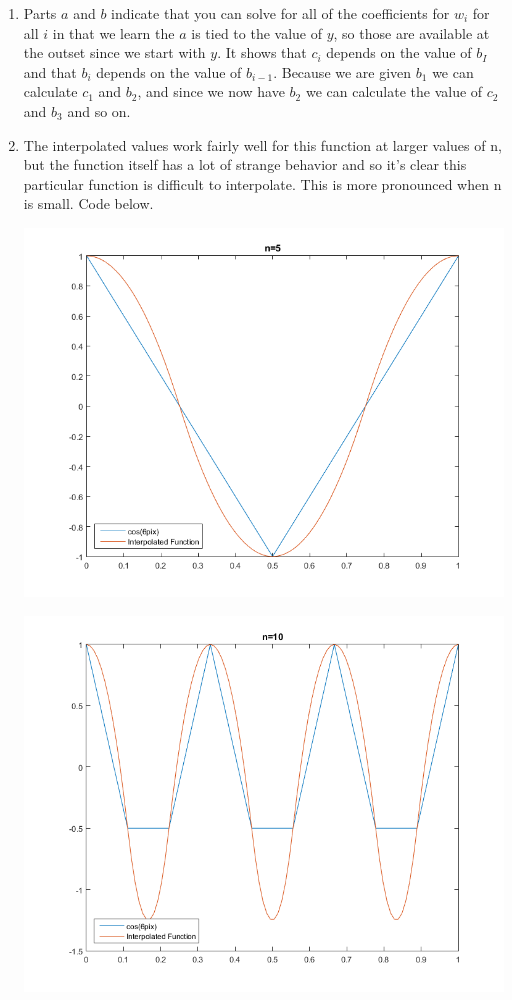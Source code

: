 \documentclass[11pt,a4paper]{article}
\begin{document}
\begin{itemize}
\begin{enumerate} [label={\alph*)}]
					\item Parts $a$ and $b$ indicate that you can solve for all of the coefficients for $w_i$ for all $i$ in that we learn the $a$ is tied to the value of $y$, so those are available at the outset since we start with $y$. It shows that $c_i$ depends on the value of $b_I$ and that $b_i$ depends on the value of $b_{i-1}$. Because we are given $b_1$ we can calculate $c_1$ and $b_2$, and since we now have $b_2$ we can calculate the value of $c_2$ and $b_3$ and so on.
					\item The interpolated values work fairly well for this function at larger values of n, but the function itself has a lot of strange behavior and so it's clear this particular function is difficult to interpolate. This is more pronounced when n is small. Code below.
					\begin{center}
						\includegraphics[width=1\linewidth]{ch5q33_5}
					\end{center}
					\begin{center}
						\includegraphics[width=1\linewidth]{ch5q33_10}

\end{center}
\end{enumerate}
\end{itemize}
\end{document}
